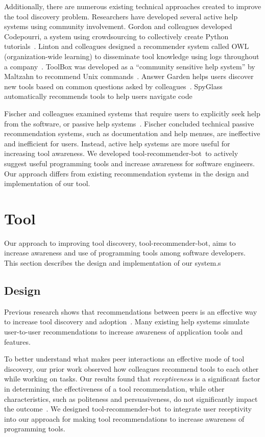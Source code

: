 \documentclass[conference]{IEEEtran}
\newcommand{\tool}{tool-recommender-bot}
\begin{document}
Additionally, there are numerous existing technical approaches created to improve the tool discovery problem. Researchers have developed several active help systems using community involvement. Gordon and colleagues developed Codepourri, a system using crowdsourcing to collectively create Python tutorials~\cite{Gordon2015Codepourri}. Linton and colleagues designed a recommender system called OWL (organization-wide learning) to disseminate tool knowledge using logs throughout a company~\cite{Linton2000OWL}. ToolBox was developed as a ``community sensitive help system'' by Maltzahn to recommend Unix commands~\cite{Maltzahn1995Toolbox}. Answer Garden helps users discover new tools based on common questions asked by colleagues~\cite{Ackerman1990AnswerGarden}. SpyGlass automatically recommends tools to help users navigate code~\cite{Viriyakattiyaporn2010Spyglass}

Fischer and colleagues examined systems that require users to explicitly seek help from the software, or passive help systems~\cite{Fischer1984ActiveHelpSystems}. Fischer concluded technical passive recommendation systems, such as documentation and help menues, are ineffective and inefficient for users. Instead, active help systems are more useful for increasing tool awareness. We developed \tool~to actively suggest useful programming tools and increase awareness for software engineers. Our approach differs from existing recommendation systems in the design and implementation of our tool.

\section{Tool}
Our approach to improving tool discovery, \tool, aims to increase awareness and use of programming tools among software developers. This section describes the design and implementation of our system.s

\subsection{Design}
Previous research shows that recommendations between peers is an effective way to increase tool discovery and adoption~\cite{MurphyHill2011PeerInteraction}. Many existing help systems simulate user-to-user recommendations to increase awareness of application tools and features. 

To better understand what makes peer interactions an effective mode of tool discovery, our prior work observed how colleagues recommend tools to each other while working on tasks. Our results found that \emph{receptiveness} is a significant factor in determining the effectiveness of a tool recommendation, while other characteristics, such as politeness and persuasiveness, do not significantly impact the outcome~\cite{vlhcc17}. We designed \tool~to integrate user receptivity into our approach for making tool recommendations to increase awareness of programming tools.
\end{document}

